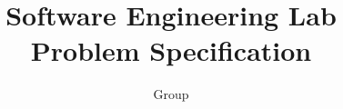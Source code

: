 \documentclass{article}
\begin{document}
\title{\textbf{Software Engineering Lab}
\\
\textbf{Problem Specification}}
\author{ Group \\[0.2in]
}

\maketitle
\end{document}
